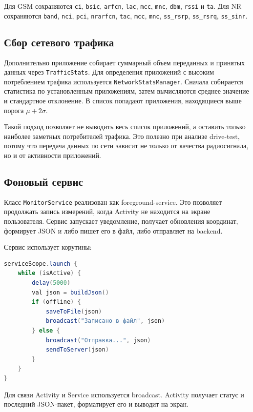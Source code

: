 \documentclass[14pt,a4paper]{extarticle}
\begin{document}
Для GSM сохраняются \texttt{ci}, \texttt{bsic}, \texttt{arfcn}, \texttt{lac}, \texttt{mcc}, \texttt{mnc}, \texttt{dbm}, \texttt{rssi} и \texttt{ta}. Для NR сохраняются \texttt{band}, \texttt{nci}, \texttt{pci}, \texttt{nrarfcn}, \texttt{tac}, \texttt{mcc}, \texttt{mnc}, \texttt{ss\_rsrp}, \texttt{ss\_rsrq}, \texttt{ss\_sinr}.

\subsection{Сбор сетевого трафика}

Дополнительно приложение собирает суммарный объем переданных и принятых данных через \texttt{TrafficStats}. Для определения приложений с высоким потреблением трафика используется \texttt{NetworkStatsManager}. Сначала собирается статистика по установленным приложениям, затем вычисляются среднее значение и стандартное отклонение. В список попадают приложения, находящиеся выше порога $\mu + 2\sigma$.

Такой подход позволяет не выводить весь список приложений, а оставить только наиболее заметных потребителей трафика. Это полезно при анализе drive-test, потому что передача данных по сети зависит не только от качества радиосигнала, но и от активности приложений.

\subsection{Фоновый сервис}

Класс \texttt{MonitorService} реализован как foreground-service. Это позволяет продолжать запись измерений, когда Activity не находится на экране пользователя. Сервис запускает уведомление, получает обновления координат, формирует JSON и либо пишет его в файл, либо отправляет на backend.

Сервис использует корутины:
\begin{lstlisting}[language=Java,caption={Цикл периодической отправки данных}]
serviceScope.launch {
    while (isActive) {
        delay(5000)
        val json = buildJson()
        if (offline) {
            saveToFile(json)
            broadcast("Записано в файл", json)
        } else {
            broadcast("Отправка...", json)
            sendToServer(json)
        }
    }
}
\end{lstlisting}

Для связи Activity и Service используется broadcast. Activity получает статус и последний JSON-пакет, форматирует его и выводит на экран.
\end{document}
